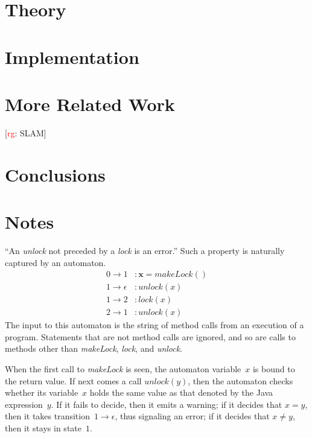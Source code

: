 \documentclass[a4paper]{article}
\newcommand{\rg}[1]{\todo{rg}{#1}}
\newcommand{\todo}[2]{{\small [\textcolor{red}{#1}: #2]}}
\theoremstyle{slanted}
\theoremstyle{definition}
\theoremstyle{remark}
\begin{document}
\section{Theory}

\section{Implementation}

\section{More Related Work}

\rg{SLAM}

\section{Conclusions}

\section{Notes}

``An \textit{unlock} not preceded by a \textit{lock} is an error.''
Such a property is naturally captured by an automaton.
\begin{equation}
\begin{aligned}
0\to1&: \mathbf{x} = \mathit{makeLock}()\\
1\to\epsilon&: \mathit{unlock}(x)\\
1\to2&: \mathit{lock}(x)\\
2\to1&: \mathit{unlock}(x)
\end{aligned}
\end{equation}
The input to this automaton is the string of method calls from an execution of a program.
Statements that are not method calls are ignored, and so are calls to methods other than \textit{makeLock}, \textit{lock}, and \textit{unlock}.

When the first call to \textit{makeLock} is seen, the automaton variable~$x$ is bound to the return value.
If next comes a call $\mathit{unlock}(y)$, then the automaton checks whether its variable~$x$ holds the same value as that denoted by the Java expression~$y$.
If it fails to decide, then it emits a warning; if it decides that $x=y$, then it takes transition~$1\to\epsilon$, thus signaling an error; if it decides that $x\ne y$, then it stays in state~$1$.
\end{document}
